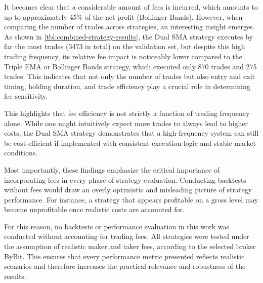\noindent
It becomes clear that a considerable amount of fees is incurred, which amounts to up to approximately 45\% of the net profit (Bollinger Bands).
However, when comparing the number of trades across strategies, an interesting insight emerges.
As shown in \autoref{tbl:combined-strategy-results}, the Dual SMA strategy executes by far the most trades (3473 in total) on the validation set, but despite this high trading frequency, its relative fee impact is noticeably lower compared to the Triple EMA or Bollinger Bands strategy, which executed only 870 trades and 275 trades.
This indicates that not only the number of trades but also entry and exit timing, holding duration, and trade efficiency play a crucial role in determining fee sensitivity.

This highlights that fee efficiency is not strictly a function of trading frequency alone.
While one might intuitively expect more trades to always lead to higher costs, the Dual SMA strategy demonstrates that a high-frequency system can still be cost-efficient if implemented with consistent execution logic and stable market conditions.

Most importantly, these findings emphasize the critical importance of incorporating fees in every phase of strategy evaluation.
Conducting backtests without fees would draw an overly optimistic and misleading picture of strategy performance.
For instance, a strategy that appears profitable on a gross level may become unprofitable once realistic costs are accounted for.

For this reason, no backtests or performance evaluation in this work was conducted without accounting for trading fees.
All strategies were tested under the assumption of realistic maker and taker fees, according to the selected broker ByBit.
This ensures that every performance metric presented reflects realistic scenarios and therefore increases the practical relevance and robustness of the results.

